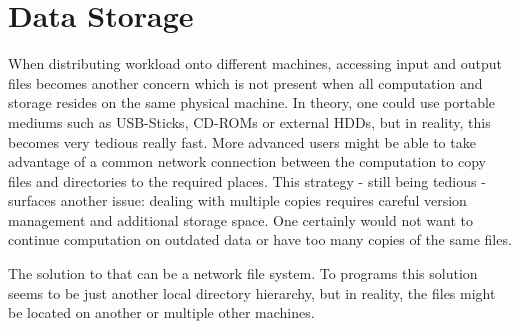 \section{Data Storage}

When distributing workload onto different machines, accessing input and output files becomes another concern which is not present when all computation and storage resides on the same physical machine.
In theory, one could use portable mediums such as USB-Sticks, CD-ROMs or external HDDs, but in reality, this becomes very tedious really fast.
More advanced users might be able to take advantage of a common network connection between the computation to copy files and directories to the required places.
This strategy - still being tedious - surfaces another issue: dealing with multiple copies requires careful version management and additional storage space.
One certainly would not want to continue computation on outdated data or have too many copies of the same files.

The solution to that can be a network file system.
To programs this solution seems to be just another local directory hierarchy, but in reality, the files might be located on another or multiple other machines.

